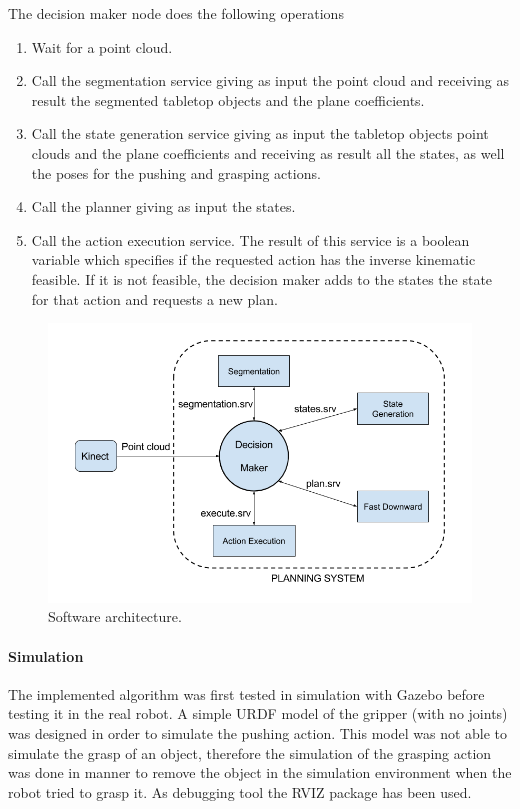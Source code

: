 The decision maker node does the following operations
\begin{enumerate}
	\item Wait for a point cloud.
	\item Call the segmentation service giving as input the point cloud and receiving as result the segmented tabletop objects and the plane coefficients.
	\item Call the state generation service giving as input the tabletop objects point clouds and the plane coefficients and receiving as result all the states, as well the poses for the pushing and grasping actions.
	\item Call the planner giving as input the states.
	\item Call the action execution service. The result of this service is a boolean variable which specifies if the requested action has the inverse kinematic feasible. If it is not feasible, the decision maker adds to the states the  state for that action and requests a new plan.
\end{enumerate}


\begin{figure}[h]
\centering
\includegraphics[width=14cm]{Img/software/Software_arquitecture.png}
\caption{Software architecture.}\label{fig:architecture}
\end{figure}


\paragraph{Simulation}
The implemented algorithm was first tested in simulation with Gazebo\citep{koenig2004design} before testing it in the real robot. A simple URDF model of the gripper (with no joints) was designed in order to simulate the pushing action. This model was not able to  simulate the grasp of an object, therefore the simulation of the grasping action was done in manner to remove the object in the simulation environment when the robot tried to grasp it. As debugging tool the RVIZ package\citep{RVIZ} has been used.  

